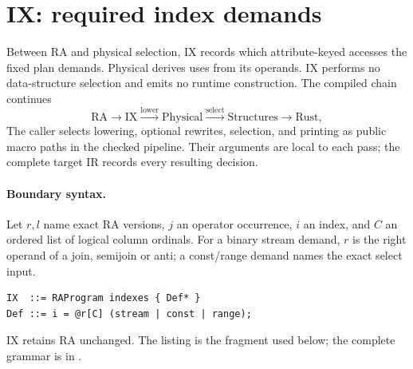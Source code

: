 \section{IX: required index demands}
\label{sec:ix}
Between RA and physical selection, IX records which attribute-keyed accesses
the fixed plan demands. Physical derives uses from its operands. IX performs
no data-structure selection and emits no runtime construction. The compiled
chain continues
\[
 \mathrm{RA}\longrightarrow\mathrm{IX}
 \xrightarrow{\text{lower}}\mathrm{Physical}
 \xrightarrow{\text{select}}\mathrm{Structures}
 \longrightarrow\mathrm{Rust},
\]
The caller selects lowering, optional rewrites, selection, and printing as
public macro paths in the checked pipeline. Their arguments are local to each
pass; the complete target IR records every resulting decision.

\paragraph{Boundary syntax.}
Let $r,l$ name exact RA versions, $j$ an operator occurrence, $i$ an index,
and $C$ an ordered list of logical column ordinals. For a binary stream demand, $r$ is the right operand of a join, semijoin
or anti; a const/range demand names the exact select input.
\begin{lstlisting}
IX  ::= RAProgram indexes { Def* }
Def ::= i = @r[C] (stream | const | range);
\end{lstlisting}
IX retains RA unchanged. The listing is the fragment used below; the complete
grammar is in .

